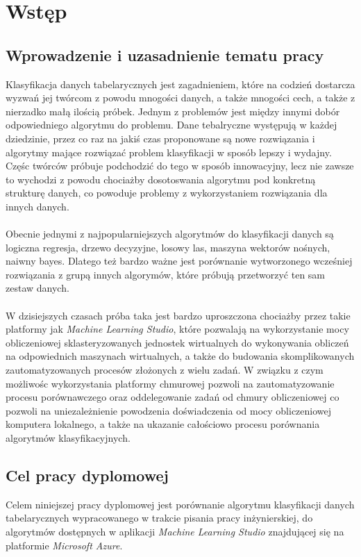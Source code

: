 \chapter{Wstęp}

\section{Wprowadzenie i uzasadnienie tematu pracy}
Klasyfikacja danych tabelarycznych jest zagadnieniem, które na codzień dostarcza wyzwań jej twórcom z powodu mnogości danych, a także mnogości cech, a także z nierzadko małą ilością próbek. Jednym z problemów jest między innymi dobór odpowiedniego algorytmu do problemu. Dane tebalryczne występują w każdej dziedzinie, przez co raz na jakiś czas proponowane są nowe rozwiązania i algorytmy mające rozwiązać problem klasyfikacji w sposób lepszy i wydajny. Częśc twórców próbuje podchodzić do tego w sposób innowacyjny, lecz nie zawsze to wychodzi z powodu chociażby dosotoswania algorytmu pod konkretną strukturę danych, co powoduje problemy z wykorzystaniem rozwiązania dla innych danych.
\\ \\
Obecnie jednymi z najpopularniejszych algorytmów do klasyfikacji danych są logiczna regresja, drzewo decyzyjne, losowy las, maszyna wektorów nośnych, naiwny bayes. Dlatego też bardzo ważne jest porównanie wytworzonego wcześniej rozwiązania z grupą innych algorymów, które próbują przetworzyć ten sam zestaw danych.
\\ \\
W dzisiejszych czasach próba taka jest bardzo uproszczona chociażby przez takie platformy jak \textit{Machine Learning Studio}, które pozwalają na wykorzystanie mocy obliczeniowej sklasteryzowanych jednostek wirtualnych do wykonywania obliczeń na odpowiednich maszynach wirtualnych, a także do budowania skomplikowanych zautomatyzowanych procesów złożonych z wielu zadań. W związku z czym możliwośc wykorzystania platformy chmurowej pozwoli na zautomatyzowanie procesu porównawczego oraz oddelegowanie zadań od chmury obliczeniowej co pozwoli na uniezależnienie powodzenia doświadczenia od mocy obliczeniowej komputera lokalnego, a także na ukazanie całościowo procesu porównania algorytmów klasyfikacyjnych.

\section{Cel pracy dyplomowej}
Celem niniejszej pracy dyplomowej jest porównanie algorytmu klasyfikacji danych tabelarycznych wypracowanego w trakcie pisania pracy inżynierskiej, do algorytmów dostępnych w aplikacji \textit{Machine Learning Studio} znajdującej się na platformie \textit{Microsoft Azure}.

